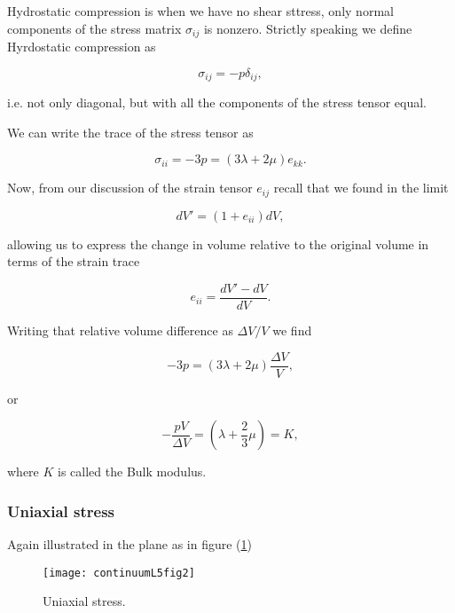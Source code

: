 Hydrostatic compression is when we have no shear sttress, only normal components of the stress matrix $\sigma_{ij}$ is nonzero.  Strictly speaking we define Hyrdostatic compression as

\begin{equation}\label{eqn:continuumL5:n}
\sigma_{ij} = -p \delta_{ij},
\end{equation}

i.e. not only diagonal, but with all the components of the stress tensor equal.

We can write the trace of the stress tensor as

\begin{equation}\label{eqn:continuumL5:n}
\sigma_{ii} = - 3 p = (3 \lambda + 2 \mu) e_{kk}.
\end{equation}

Now, from our discussion of the strain tensor $e_{ij}$ recall that we found in the limit

\begin{equation}\label{eqn:continuumL5:n}
dV' = (1 + e_{ii}) dV,
\end{equation}

allowing us to express the change in volume relative to the original volume in terms of the strain trace

\begin{equation}\label{eqn:continuumL5:n}
e_{ii} = \frac{dV' - dV}{dV}.
\end{equation}

Writing that relative volume difference as $\Delta V/V$ we find

\begin{equation}\label{eqn:continuumL5:n}
- 3 p = (3 \lambda + 2 \mu) \frac{\Delta V}{V},
\end{equation}

or

\begin{equation}\label{eqn:continuumL5:n}
- \frac{ p V}{\Delta V} = \left( \lambda + \frac{2}{3} \mu \right) = K,
\end{equation}

where $K$ is called the Bulk modulus.

\subsubsection{Uniaxial stress}

Again illustrated in the plane as in figure (\ref{fig:continuumL5:continuumL5fig2})
\begin{figure}[htp]
   \centering
   \texttt{[image: continuumL5fig2]}
   \caption{Uniaxial stress.}\label{fig:continuumL5:continuumL5fig2}
\end{figure}

